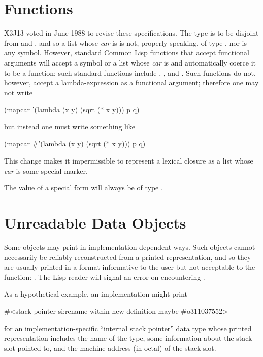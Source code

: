 \section{Functions}
\label{FUNCTION-TYPE-SECTION}

\begin{newer}
X3J13 voted in June 1988 
to revise these specifications.  The type  is to be disjoint
from  and , and so a list whose \emph{car} is 
is not, properly speaking, of type , nor is any symbol.
However,
standard Common Lisp functions that accept functional arguments
will accept a symbol or a list whose \emph{car} is 
and automatically coerce it to be a function; such standard
functions include , , and .
Such functions do not, however, accept a lambda-expression as a functional
argument; therefore one may not write

\vskip 3pt
\begin{lisp}
(mapcar '(lambda (x y) (sqrt (* x y))) p q)
\end{lisp}
but instead one must write something like
\begin{lisp}
(mapcar \#'(lambda (x y) (sqrt (* x y))) p q)
\end{lisp}

This change makes it impermissible to represent a lexical closure
as a list whose \emph{car} is some special marker.

The value of a  special form
will always be of type .
\end{newer}

\section{Unreadable Data Objects}

Some objects may print in implementation-dependent ways.
Such objects cannot necessarily be reliably reconstructed from
a printed representation, and so they are usually printed in
a format informative to the user but not acceptable to the  function:
.
The Lisp reader will signal an error on encountering \cd{\#<}.

As a hypothetical example, an implementation might print
\begin{lisp}
\#<stack-pointer si:rename-within-new-definition-maybe \#o311037552>
\end{lisp}
for an implementation-specific ``internal stack pointer'' data type
whose printed representation includes the name of the type,
some information about the stack slot pointed to, and the machine address
(in octal) of the stack slot.

